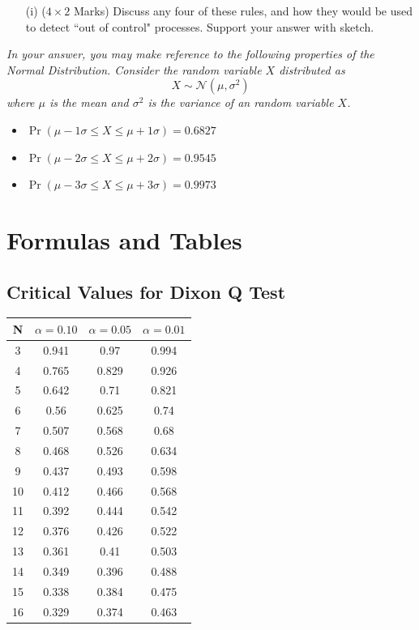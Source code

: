 \documentclass[a4paper,12pt]{article}
\begin{document}
\begin{itemize}
	\item[(i)] ($4 \times 2$ Marks) Discuss any four of these rules, and how they would be used to detect ``out of control" processes. Support your answer with sketch.
\end{itemize}

\bigskip 
\begin{framed}
	\noindent \textit{In your answer, you may make reference to the following properties of the Normal Distribution. Consider the random variable $X$ distributed as
		\[X \sim \mathcal{N}(\mu,\sigma^2)\]
		where $\mu$ is the mean and $\sigma^2$ is the variance of an random variable $X$.}
	\begin{itemize}
		\item $\Pr( \mu - 1\sigma \leq X \leq \mu + 1\sigma ) = 0.6827$
		\item $\Pr( \mu - 2\sigma \leq X \leq \mu + 2\sigma ) = 0.9545$
		\item $\Pr( \mu - 3\sigma \leq X \leq \mu + 3\sigma )= 0.9973$
		
	\end{itemize}
\end{framed}
\newpage



\section*{Formulas and Tables}

\subsection*{Critical Values for Dixon Q Test}


	{
		\Large
		\begin{center}
			\begin{tabular}{|c|c|c|c|}
				\hline  N  & $\alpha=0.10$  & $\alpha=0.05$  & $\alpha=0.01$  \\ \hline
				3  & 0.941 & 0.97  & 0.994 \\ \hline
				4  & 0.765 & 0.829 & 0.926 \\ \hline
				5  & 0.642 & 0.71  & 0.821 \\ \hline
				6  & 0.56  & 0.625 & 0.74  \\ \hline
				7  & 0.507 & 0.568 & 0.68  \\ \hline
				8  & 0.468 & 0.526 & 0.634 \\ \hline
				9  & 0.437 & 0.493 & 0.598 \\ \hline
				10 & 0.412 & 0.466 & 0.568 \\ \hline
				11 & 0.392 & 0.444 & 0.542 \\ \hline
				12 & 0.376 & 0.426 & 0.522 \\ \hline
				13 & 0.361 & 0.41  & 0.503 \\ \hline
				14 & 0.349 & 0.396 & 0.488 \\ \hline
				15 & 0.338 & 0.384 & 0.475 \\ \hline
				16 & 0.329 & 0.374 & 0.463 \\ \hline
			\end{tabular} 
		\end{center}
	}
\end{document}
